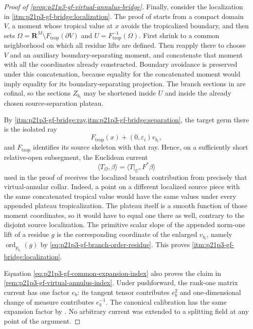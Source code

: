 \begin{proof}[Proof of
\cref{prop:p21p3-gf-virtual-annulus-bridge}]
Finally, consider the localization in
\cref{itm:p21p3-gf-bridge:localization}.  The proof of
\cite[Theorem~16.8.5]{CLD25} starts from a compact domain \(V\), a moment
whose tropical value at \(x\) avoids the tropicalized boundary, and then sets
\(
\Omega=\mathbf R^M\setminus F_{\mathrm{trop}}(\partial V)
\)
and \(U=F_{\mathrm{trop}}^{-1}(\Omega)\).  First shrink to a common
neighborhood on which all residue lifts are defined.  Then reapply
\cite[Lemma~12.3.6]{CLD25} there to choose \(V\) and an auxiliary
boundary-separating moment, and concatenate that moment with all the
coordinates already constructed.  Boundary avoidance is preserved under
this concatenation, because equality for the concatenated moment would
imply equality for its boundary-separating projection.  The branch sections in
\cite[\S4.3.10.3]{Ducros24CurveStructure} are cofinal, so the sections
\(Z_{b_i}\) may be shortened inside \(U\) and inside the already chosen
source-separation plateau.

By
\cref{itm:p21p3-gf-bridge:ray,itm:p21p3-gf-bridge:separation}, the target
germ there is the isolated ray
\[
 F_{\mathrm{trop}}(x)+(0,\varepsilon_i)v_{b_i},
\]
and \(F_{\mathrm{trop}}\) identifies its source skeleton with that ray.  Hence,
on a sufficiently short relative-open subsegment, the Euclidean current
\[
 \langle T_{\Omega},\beta\rangle
       =\langle T|_U,F^*\beta\rangle
\]
used in the proof of \cite[Theorem~16.8.5]{CLD25} receives the localized
branch contribution from precisely that virtual-annular collar.  Indeed, a
point on a different localized source piece with the same concatenated
tropical value would have the same values under every appended plateau
tropicalization.  The plateau itself is a smooth function of those moment
coordinates, so it would have to equal one there as well, contrary to the
disjoint source localization.  The
primitive scalar slope of the appended norm-one lift of a residue \(g\) is
the corresponding coordinate of the enlarged \(v_{b_i}\), namely
\(\operatorname{ord}_{p_{b_i}}(g)\) by
\eqref{eq:p21p3-gf-branch-order-residue}.  This proves
\cref{itm:p21p3-gf-bridge:localization}.

Equation \eqref{eq:p21p3-gf-common-expansion-index} also proves the claim in
\cref{rem:p21p3-gf-virtual-annulus-index}.  Under pushforward, the rank-one
matrix current has one factor \(e_b\): its tangent tensor contributes
\(e_b^2\) and one-dimensional change of measure contributes \(e_b^{-1}\).
The canonical calibration has the same expansion factor by
\cite[\S14.3.2, Lemma~14.3.4, and Proposition~14.4.2]{CLD25}.  No arbitrary
current was extended to a splitting field at any point of the argument.
\end{proof}

